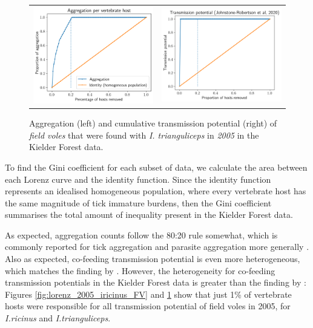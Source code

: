 \documentclass[hidelinks]{article}
\begin{document}
\begin{figure}[]
	\begin{mdframed}[backgroundcolor=grey250,rightline=false,leftline=false,topline=false]
	\centering
	\begin{tabular}{ll}
		\includegraphics[width=.48\linewidth,valign=m]{lorenz_aggregation_FV_2005_I.Trianguliceps} & \includegraphics[width=.48\linewidth,valign=m]{lorenz_JR_FV_2005_I.Trianguliceps} \\
	\end{tabular}
	\caption{Aggregation (left) and cumulative transmission potential (right) of \textit{field voles} that were found with \textit{I. trianguliceps} in \textit{2005} in the Kielder Forest data.}
	\label{fig:lorenz_2005_itrianguliceps_FV}
	\end{mdframed}
\end{figure}

To find the Gini coefficient for each subset of data, we calculate the area between each Lorenz curve and the identity function. Since the identity function represents an idealised homogeneous population, where every vertebrate host has the same magnitude of tick immature burdens, then the Gini coefficient summarises the total amount of inequality present in the Kielder Forest data. 

As expected, aggregation counts follow the 80:20 rule somewhat, which is commonly reported for tick aggregation and parasite aggregation more generally \citep{Woolhouse1997, Ferreri2014, Brunner2008}. Also as expected, co-feeding transmission potential is even more heterogeneous, which matches the finding by  \citet{Perkins_2003}. However, the heterogeneity for co-feeding transmission potentials in the Kielder Forest data is greater than the finding by \citet{Perkins_2003}: Figures \ref{fig:lorenz_2005_iricinus_FV} and \ref{fig:lorenz_2005_itrianguliceps_FV} show that just 1\% of vertebrate hosts were responsible for all transmission potential of field voles in 2005, for \textit{I.ricinus} and \textit{I.trianguliceps}.
\end{document}
